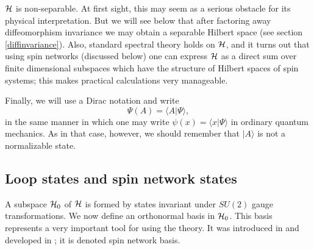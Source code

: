 $\cal H$ is non-separable.  At first sight, this may seem as a 
serious obstacle for its physical interpretation.  But we will 
see below that after factoring away diffeomorphism invariance we 
may obtain a separable Hilbert space (see section 
\ref{diffinvariance}).  Also, standard spectral theory holds on 
$\cal H$, and it turns out that using spin networks (discussed 
below) one can express $\cal H$ as a direct sum over finite 
dimensional subspaces which have the structure of Hilbert spaces 
of spin systems; this makes practical calculations very 
manageable.

Finally, we will use a Dirac notation and write 
\begin{equation}
	\Psi(A) = \langle A | \Psi \rangle,
	\label{dirac}
\end{equation}
in the same manner in which one may write $\psi(x) = \langle x | 
\Psi \rangle$ in ordinary quantum mechanics. As in that case, 
however, we should remember that $|A\rangle$ is not a 
normalizable state. 

\subsection{Loop states and spin network states}
\label{states}

A subspace ${\cal H}_{0}$ of $\cal H$ is formed by states 
invariant under $SU(2)$ gauge transformations.  We now define an 
orthonormal basis in ${\cal H}_{0}$.  This basis represents a 
very important tool for using the theory.  It was introduced in 
\cite{RovelliSmolin95b} and developed in \cite{Baez95a,Baez95aa}; 
it is denoted spin network basis.

